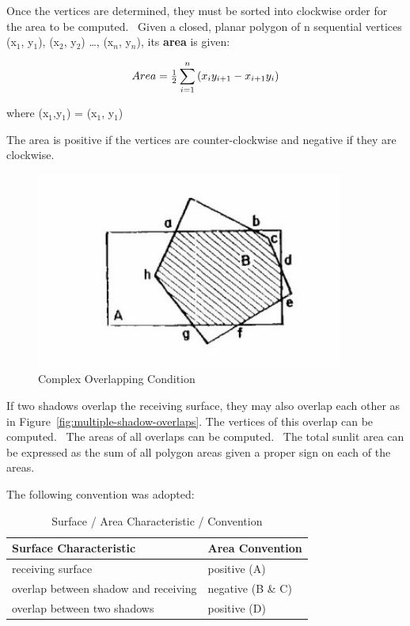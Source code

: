 Once the vertices are determined, they must be sorted into clockwise order for the area to be computed.~ Given a closed, planar polygon of n sequential vertices (x\(_{1}\), y\(_{1}\)), (x\(_{2}\), y\(_{2}\)) \ldots{}, (x\(_{n}\), y\(_{n}\)), its \textbf{area} is given:

\begin{equation}
Area = {\textstyle{1 \over 2}}\sum\limits_{i = 1}^n {({x_i}{y_{i + 1}} - {x_{i + 1}}{y_i})}
\end{equation}

where (x\(_{1}\),y\(_{1}\)) = (x\(_{1}\), y\(_{1}\))

The area is positive if the vertices are counter-clockwise and negative if they are clockwise.

\begin{figure}[hbtp] %
\centering
\includegraphics[width=0.9\textwidth, height=0.9\textheight, keepaspectratio=true]{media/image641.png}
\caption{  Complex Overlapping Condition \protect \label{fig:complex-overlapping-condition}}
\end{figure}

If two shadows overlap the receiving surface, they may also overlap each other as in Figure~\ref{fig:multiple-shadow-overlaps}. The vertices of this overlap can be computed.~ The areas of all overlaps can be computed.~ The total sunlit area can be expressed as the sum of all polygon areas given a proper sign on each of the areas.

The following convention was adopted:

\begin{longtable}[c]{@{}ll@{}}
\caption{  Surface / Area Characteristic / Convention \protect \label{table:surface-area-characteristic-convention}}\\
\toprule 
Surface Characteristic & Area Convention \tabularnewline \midrule
\endhead
receiving surface & positive (A) \tabularnewline
overlap between shadow and receiving & negative (B  \&  C) \tabularnewline
overlap between two shadows & positive (D) \tabularnewline
\bottomrule
\end{longtable}

